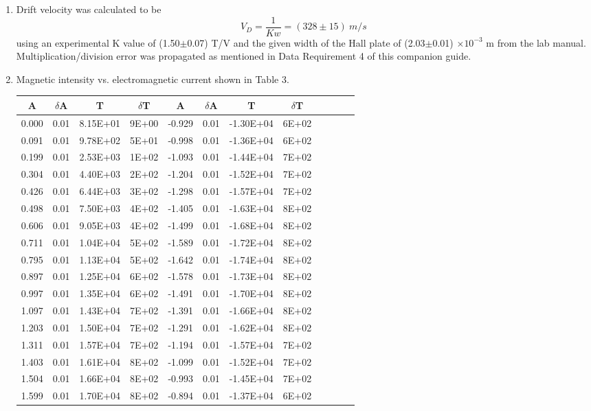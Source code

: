 \begin{enumerate}[resume]
\item Drift velocity was calculated to be 
$$
V_D=\frac{1}{Kw}=(328\pm15)\ m/s
$$
using an experimental K value of (1.50$\pm$0.07) T/V and the given width of the Hall plate of (2.03$\pm$0.01) $\times 10^{-3}$ m from the lab manual. Multiplication/division error was propagated as mentioned in Data Requirement 4 of this companion guide.



\item Magnetic intensity vs. electromagnetic current shown in Table 3.
  \begin{table}
    \begin{tabular}{|c|c|c|c|c|c|c|c|c|c|c|c|}
      \hline
      A & $\delta$A & T & $\delta$T & A & $\delta$A & T & $\delta$T\\
      \hline
      0.000&0.01&8.15E+01&9E+00&-0.929&0.01&-1.30E+04&6E+02\\
      0.091&0.01&9.78E+02&5E+01&-0.998&0.01&-1.36E+04&6E+02\\
      0.199&0.01&2.53E+03&1E+02&-1.093&0.01&-1.44E+04&7E+02\\
      0.304&0.01&4.40E+03&2E+02&-1.204&0.01&-1.52E+04&7E+02\\
      0.426&0.01&6.44E+03&3E+02&-1.298&0.01&-1.57E+04&7E+02\\
      0.498&0.01&7.50E+03&4E+02&-1.405&0.01&-1.63E+04&8E+02\\
      0.606&0.01&9.05E+03&4E+02&-1.499&0.01&-1.68E+04&8E+02\\
      0.711&0.01&1.04E+04&5E+02&-1.589&0.01&-1.72E+04&8E+02\\
      0.795&0.01&1.13E+04&5E+02&-1.642&0.01&-1.74E+04&8E+02\\
      0.897&0.01&1.25E+04&6E+02&-1.578&0.01&-1.73E+04&8E+02\\
      0.997&0.01&1.35E+04&6E+02&-1.491&0.01&-1.70E+04&8E+02\\
      1.097&0.01&1.43E+04&7E+02&-1.391&0.01&-1.66E+04&8E+02\\
      1.203&0.01&1.50E+04&7E+02&-1.291&0.01&-1.62E+04&8E+02\\
      1.311&0.01&1.57E+04&7E+02&-1.194&0.01&-1.57E+04&7E+02\\
      1.403&0.01&1.61E+04&8E+02&-1.099&0.01&-1.52E+04&7E+02\\
      1.504&0.01&1.66E+04&8E+02&-0.993&0.01&-1.45E+04&7E+02\\
      1.599&0.01&1.70E+04&8E+02&-0.894&0.01&-1.37E+04&6E+02\\

\end{tabular}
\end{table}
\end{enumerate}
